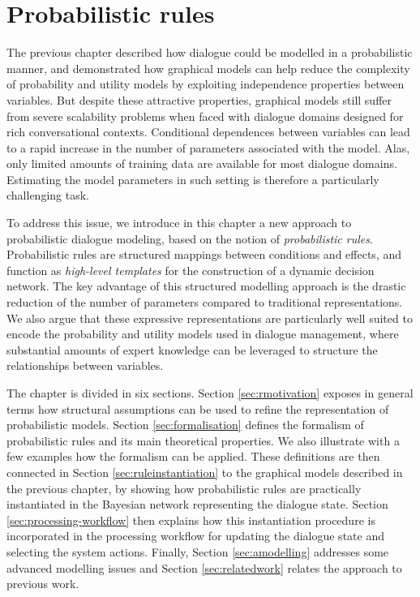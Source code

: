 \chapter{Probabilistic rules}
\label{chap:rules}

The previous chapter described how dialogue could be modelled in a probabilistic manner, and demonstrated how graphical models can help reduce the complexity of probability and utility models by exploiting independence properties between variables. But despite these attractive properties, graphical models still suffer from severe scalability problems when faced with dialogue domains designed for rich conversational contexts.  Conditional dependences between variables can lead to a rapid increase in the number of parameters associated with the model. Alas, only limited amounts of training data are available for most dialogue domains.  Estimating the model parameters in such setting is therefore a particularly challenging task. 

To address this issue, we introduce in this chapter a new approach to probabilistic dialogue modeling, based on the notion of \textit{probabilistic rules}.  Probabilistic rules are structured mappings between conditions and effects, and function as \textit{high-level templates} for the construction of a dynamic decision network.  The key advantage of this structured modelling approach is the drastic reduction of the number of parameters compared to traditional representations.  We also argue that these expressive representations are particularly well suited to encode the probability and utility models used in dialogue management, where substantial amounts of expert knowledge can be leveraged to structure the relationships between variables. 

The chapter is divided in six sections. Section \ref{sec:rmotivation} exposes in general terms how structural assumptions can be used to refine the representation of probabilistic models. 
Section \ref{sec:formalisation} defines the formalism of probabilistic rules and its main theoretical properties.  We also illustrate with a few examples how the formalism can be applied.  These definitions are then connected in Section \ref{sec:ruleinstantiation} to the graphical models described in the previous chapter, by showing how probabilistic rules are practically instantiated in the Bayesian network representing the dialogue state. Section \ref{sec:processing-workflow} then explains how this instantiation procedure is incorporated in the processing workflow for updating the dialogue state and selecting the system actions. Finally, Section \ref{sec:amodelling} addresses some advanced modelling issues and Section \ref{sec:relatedwork} relates the approach to previous work.


